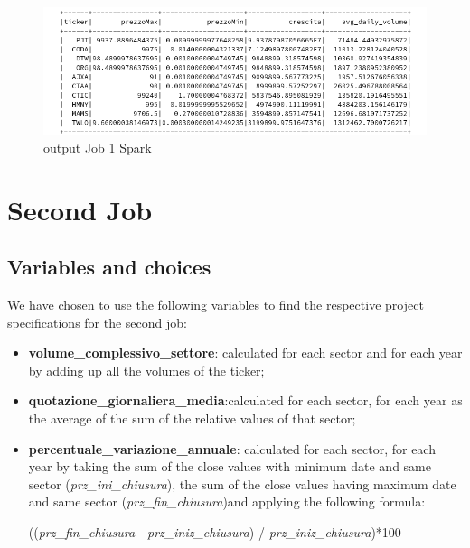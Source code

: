 \documentclass[]{report}
\begin{document}
\begin{center}
	\begin{figure}[!htb]
		\hspace{-2 cm}
		\includegraphics[width=1.4 \linewidth]{figure/output1spark}
		\caption{output Job 1 Spark}
	\end{figure}
\end{center}
\chapter*{Second Job}

\section*{Variables and choices}
We have chosen to use the following variables to find the respective project specifications for the second job:
\begin{itemize}
	\item \textbf{volume\_complessivo\_settore}: calculated for each sector and for each year by adding up all the volumes of the ticker;
	
	\item \textbf{quotazione\_giornaliera\_media}:calculated for each sector, for each year as the average of the sum of the relative values of that sector;

	\item \textbf{percentuale\_variazione\_annuale}: calculated for each sector, for each year by taking the sum of the close values with minimum date and same sector (\textit{prz\_ini\_chiusura}), the sum of the close values having maximum date and same sector (\textit{prz\_fin\_chiusura})and applying the following formula:
	\begin{center}
			((\textit{prz\_fin\_chiusura} - \textit{prz\_iniz\_chiusura}) / \textit{prz\_iniz\_chiusura})*100 
	\end{center}
	
\end{itemize}
\end{document}
